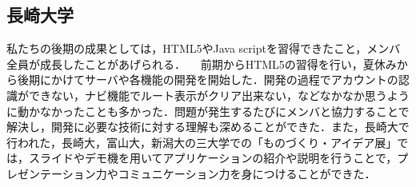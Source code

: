 \subsection{長崎大学}
私たちの後期の成果としては，HTML5やJava scriptを習得できたこと，メンバ全員が成長したことがあげられる．
　前期からHTML5の習得を行い，夏休みから後期にかけてサーバや各機能の開発を開始した．開発の過程でアカウントの認識ができない，ナビ機能でルート表示がクリア出来ない，などなかなか思うように動かなかったことも多かった．問題が発生するたびにメンバと協力することで解決し，開発に必要な技術に対する理解も深めることができた．また，長崎大で行われた，長崎大，富山大，新潟大の三大学での「ものづくり・アイデア展」では，スライドやデモ機を用いてアプリケーションの紹介や説明を行うことで，プレゼンテーション力やコミュニケーション力を身につけることができた．

